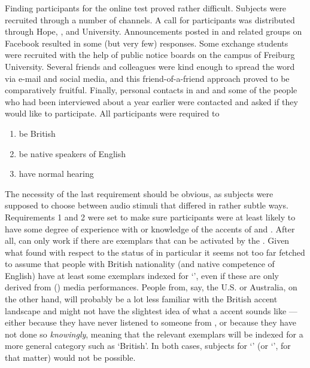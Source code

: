 Finding participants for the online test proved rather difficult.
Subjects were recruited through a number of channels.
A call for participants was distributed through Hope, , and  University.
Announcements posted in  and  related groups on Facebook resulted in some (but very few) responses.
Some exchange students were recruited with the help of public notice boards on the campus of Freiburg University.
Several friends and colleagues were kind enough to spread the word via e-mail and social media, and this friend-of-a-friend approach proved to be comparatively fruitful.
Finally, personal contacts in  and  and some of the people who had been interviewed about a year earlier were contacted and asked if they would like to participate.
All participants were required to
\begin{enumerate}
	\item be British
	\item be native speakers of English
	\item have normal hearing
\end{enumerate}
The necessity of the last requirement should be obvious, as subjects were supposed to choose between audio stimuli that differed in rather subtle ways.
Requirements 1 and 2 were set to make sure participants were at least likely to have some degree of experience with or knowledge of the accents of  and .
After all,   can only work if there are exemplars that can be activated by the .
Given what \textcite{montgomery2007} found with respect to the status of  in particular it seems not too far fetched to assume that people with British nationality (and native competence of English) have at least some exemplars indexed for `', even if these are only derived from () media performances.
People from, say, the U.S. or Australia, on the other hand, will probably be a lot less familiar with the British accent landscape and might not have the slightest idea of what a  accent sounds like --- either because they have never listened to someone from , or because they have not done so \emph{knowingly}, meaning that the relevant exemplars will be indexed for a more general category such as `British'.
In both cases,  subjects for `' (or `', for that matter) would not be possible.

